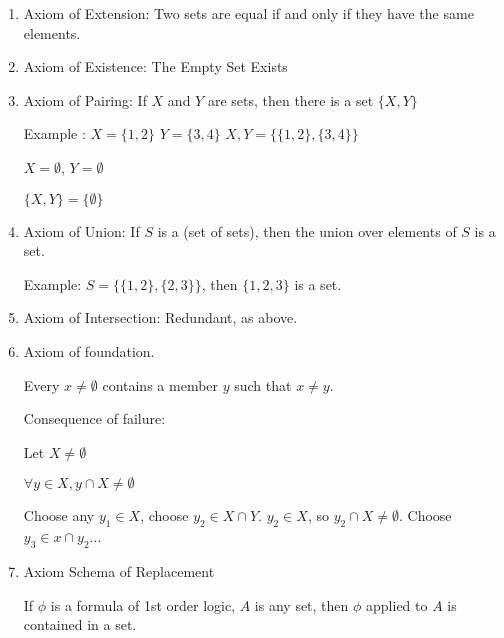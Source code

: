 \documentclass[twoside]{article}
\begin{document}
\begin{enumerate}
    \item Axiom of Extension:
          Two sets are equal if and only if they have the same elements.

    \item Axiom of Existence:
          The Empty Set Exists

    \item Axiom of Pairing:
          If $X$ and $Y$ are sets, then there is a set $\{X, Y\}$

          Example : $X = \{1,2\}$         $Y = \{3,4\}$
          ${X,Y} = \{\{1,2\}, \{3,4\}\}$

          $X = \emptyset$, $Y = \emptyset$

          $\{X,Y\} = \{\emptyset\}$

    \item Axiom of Union:        If $S$ is a (set of sets), then the union over elements of $S$ is a set.

          Example: $S = \{\{1,2\}, \{2,3\}\}$, then $\{1,2,3\}$ is a set.

    \item Axiom of Intersection: Redundant, as above.

    \item Axiom of foundation.

          Every $x \neq \emptyset$ contains a member $y$ such that $x \neq y$.

          Consequence of failure:

          Let $X \neq \emptyset$

          $\forall y \in X, y \cap X \neq \emptyset$

          Choose any $y_1 \in X$, choose $y_2 \in X \cap Y$. $y_2 \in X$, so $y_2 \cap X \neq \emptyset$. Choose $y_3 \in x \cap y_2$...

    \item Axiom Schema of Replacement

          If $\phi$ is a formula of 1st order logic, $A$ is any set, then $\phi$ applied to $A$ is contained in a set.

\end{enumerate}
\end{document}
